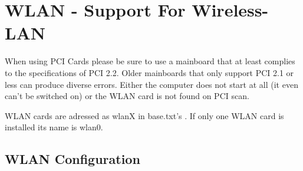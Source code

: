 {
\section {WLAN - Support For Wireless-LAN}
}

When using  PCI Cards please be sure to use a mainboard that at least 
complies to the specifications of PCI 2.2. Older mainboards that only 
support PCI 2.1 or less can produce diverse errors. Either the computer 
does not start at all (it even can't be switched on) or the WLAN card 
is not found on PCI scan.

WLAN cards are adressed as wlanX in base.txt's . If only 
one WLAN card is installed its name is wlan0.

\subsection{WLAN Configuration}

